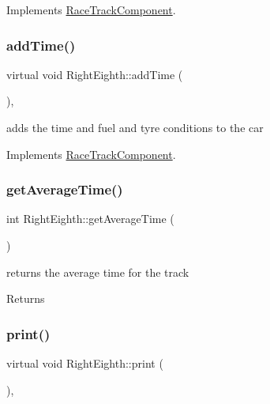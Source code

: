 Implements \mbox{\hyperlink{class_race_track_component_af89a6b453dfd3fb39fce27576012106f}{Race\+Track\+Component}}.

\mbox{\label{class_right_eighth_adbe57086dd69560284c4df28fcd29221}} 
\subsubsection{\texorpdfstring{add\+Time()}{addTime()}}
{\footnotesize\ttfamily virtual void Right\+Eighth\+::add\+Time (\begin{DoxyParamCaption}{ }\end{DoxyParamCaption})\hspace{0.3cm}{\ttfamily [inline]}, {\ttfamily [virtual]}}

adds the time and fuel and tyre conditions to the car 

Implements \mbox{\hyperlink{class_race_track_component_aa815404c45ba7df3786c3add177eb7e6}{Race\+Track\+Component}}.

\mbox{\label{class_right_eighth_aca7a2c78f66db5c710e68f6a6236f992}} 
\subsubsection{\texorpdfstring{get\+Average\+Time()}{getAverageTime()}}
{\footnotesize\ttfamily int Right\+Eighth\+::get\+Average\+Time (\begin{DoxyParamCaption}{ }\end{DoxyParamCaption})\hspace{0.3cm}{\ttfamily [inline]}}

returns the average time for the track \begin{DoxyReturn}{Returns}

\end{DoxyReturn}
\mbox{\label{class_right_eighth_a2d35c272dce18f3f6e9e297605877794}} 
\subsubsection{\texorpdfstring{print()}{print()}}
{\footnotesize\ttfamily virtual void Right\+Eighth\+::print (\begin{DoxyParamCaption}{ }\end{DoxyParamCaption})\hspace{0.3cm}{\ttfamily [inline]}, {\ttfamily [virtual]}}

